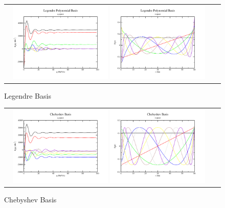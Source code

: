 \documentclass[aps,prl,twocolumn,floatfix,preprintnumbers,showpacs]{revtex4}
\begin{document}
\begin{figure}
\begin{tabular}{cc}        
\includegraphics[width=0.47\textwidth]{basis_function_plots/Legendre_Basis_q}    
\includegraphics[width=0.47\textwidth]{basis_function_plots/Legendre_Basis_r}    
\end{tabular}    
\caption{\label{Legendre} Legendre Basis}    
\end{figure}

\begin{figure}
\begin{tabular}{cc}        
\includegraphics[width=0.47\textwidth]{basis_function_plots/Chebyshev_Basis_q}    
\includegraphics[width=0.47\textwidth]{basis_function_plots/Chebyshev_Basis_r}    
\end{tabular}    
\caption{\label{Chebyshev} Chebyshev Basis}    
\end{figure}
\end{document}
